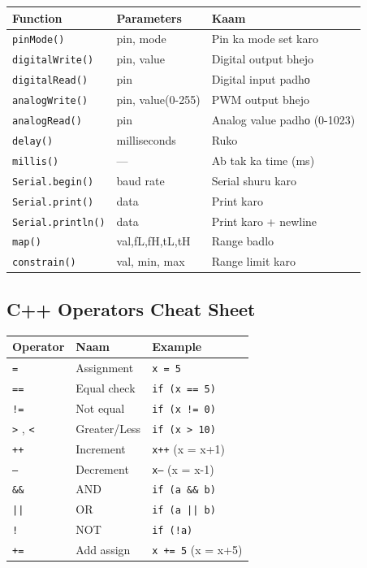 \documentclass[12pt,a4paper]{article}
\begin{document}
\begin{center}
\begin{tabular}{|l|l|l|}
\hline
\rowcolor{arduinoBlue!20}
\textbf{Function} & \textbf{Parameters} & \textbf{Kaam} \\
\hline
\texttt{pinMode()} & pin, mode & Pin ka mode set karo \\
\hline
\texttt{digitalWrite()} & pin, value & Digital output bhejo \\
\hline
\texttt{digitalRead()} & pin & Digital input padhо \\
\hline
\texttt{analogWrite()} & pin, value(0-255) & PWM output bhejo \\
\hline
\texttt{analogRead()} & pin & Analog value padhо (0-1023) \\
\hline
\texttt{delay()} & milliseconds & Ruko \\
\hline
\texttt{millis()} & — & Ab tak ka time (ms) \\
\hline
\texttt{Serial.begin()} & baud rate & Serial shuru karo \\
\hline
\texttt{Serial.print()} & data & Print karo \\
\hline
\texttt{Serial.println()} & data & Print karo + newline \\
\hline
\texttt{map()} & val,fL,fH,tL,tH & Range badlo \\
\hline
\texttt{constrain()} & val, min, max & Range limit karo \\
\hline
\end{tabular}
\end{center}

\subsection{C++ Operators Cheat Sheet}

\begin{center}
\begin{tabular}{|l|l|l|}
\hline
\rowcolor{arduinoBlue!20}
\textbf{Operator} & \textbf{Naam} & \textbf{Example} \\
\hline
\texttt{=} & Assignment & \texttt{x = 5} \\
\hline
\texttt{==} & Equal check & \texttt{if (x == 5)} \\
\hline
\texttt{!=} & Not equal & \texttt{if (x != 0)} \\
\hline
\texttt{>} , \texttt{<} & Greater/Less & \texttt{if (x > 10)} \\
\hline
\texttt{++} & Increment & \texttt{x++} (x = x+1) \\
\hline
\texttt{--} & Decrement & \texttt{x--} (x = x-1) \\
\hline
\texttt{\&\&} & AND & \texttt{if (a \&\& b)} \\
\hline
\texttt{||} & OR & \texttt{if (a || b)} \\
\hline
\texttt{!} & NOT & \texttt{if (!a)} \\
\hline
\texttt{+=} & Add assign & \texttt{x += 5} (x = x+5) \\
\hline
\end{tabular}
\end{center}
\end{document}
